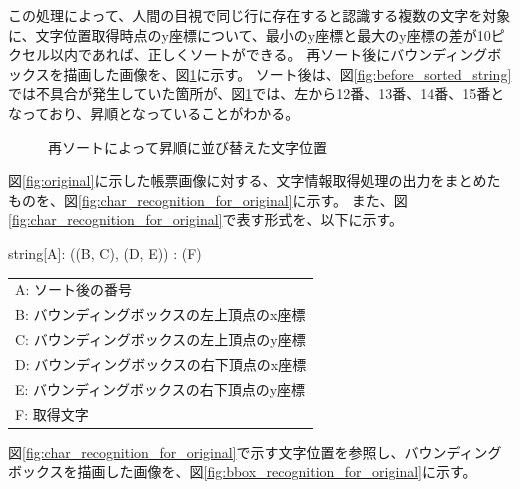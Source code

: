 この処理によって、人間の目視で同じ行に存在すると認識する複数の文字を対象に、文字位置取得時点のy座標について、最小のy座標と最大のy座標の差が10ピクセル以内であれば、正しくソートができる。
再ソート後にバウンディングボックスを描画した画像を、図\ref{fig:after_sorted_string}に示す。
ソート後は、図\ref{fig:before_sorted_string}では不具合が発生していた箇所が、図\ref{fig:after_sorted_string}では、左から12番、13番、14番、15番となっており、昇順となっていることがわかる。

\begin{figure}[t]
    \begin{center}
        \caption{再ソートによって昇順に並び替えた文字位置}
        \label{fig:after_sorted_string}
    \end{center}
\end{figure}

図\ref{fig:original}に示した帳票画像に対する、文字情報取得処理の出力をまとめたものを、図\ref{fig:char_recognition_for_original}に示す。
また、図\ref{fig:char_recognition_for_original}で表す形式を、以下に示す。

\begin{center}
    string[A]: ((B, C), (D, E)) : (F)
\end{center}

\begin{center}
    \begin{tabular}{l}
    A: ソート後の番号\\  
    B: バウンディングボックスの左上頂点のx座標\\
    C: バウンディングボックスの左上頂点のy座標\\  
    D: バウンディングボックスの右下頂点のx座標\\
    E: バウンディングボックスの右下頂点のy座標\\
    F: 取得文字\\
    \end{tabular}
\end{center}

図\ref{fig:char_recognition_for_original}で示す文字位置を参照し、バウンディングボックスを描画した画像を、図\ref{fig:bbox_recognition_for_original}に示す。

